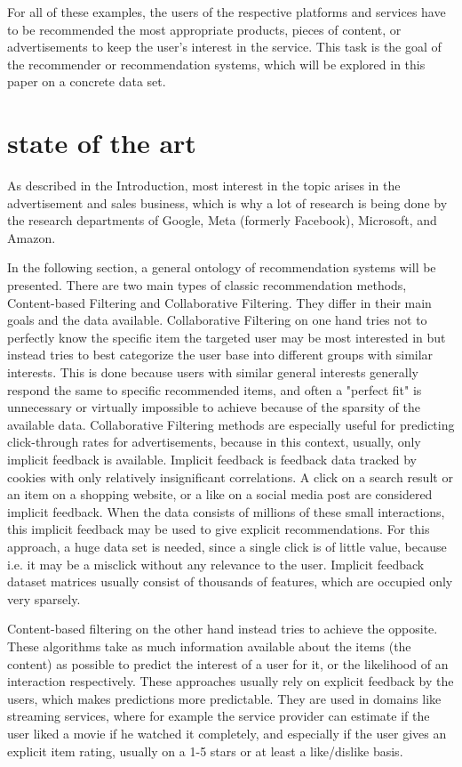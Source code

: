 \documentclass[10pt,final,journal,a4paper,oneside,twocolumn]{IEEEtran}
\begin{document}
For all of these examples, the users of the respective platforms and services have to be recommended the most appropriate products, pieces of content, or advertisements to keep the user's interest in the service. This task is the goal of the recommender or recommendation systems, which will be explored in this paper on a concrete data set.

\section{state of the art}\label{sec:stateoftheart}
As described in the Introduction, most interest in the topic arises in the advertisement and sales business, which is why a lot of research is being done by the research departments of Google, Meta (formerly Facebook), Microsoft, and Amazon.

In the following section, a general ontology of recommendation systems will be presented.
There are two main types of classic recommendation methods, Content-based Filtering and Collaborative Filtering. They differ in their main goals and the data available. 
Collaborative Filtering on one hand tries not to perfectly know the specific item the targeted user may be most interested in but instead tries to best categorize the user base into different groups with similar interests. This is done because users with similar general interests generally respond the same to specific recommended items, and often a "perfect fit" is unnecessary or virtually impossible to achieve because of the sparsity of the available data.
Collaborative Filtering methods are especially useful for predicting click-through rates for advertisements, because in this context, usually, only implicit feedback is available. Implicit feedback is feedback data tracked by cookies with only relatively insignificant correlations. A click on a search result or an item on a shopping website, or a like on a social media post are considered implicit feedback.  When the data consists of millions of these small interactions, this implicit feedback may be used to give explicit recommendations. For this approach, a huge data set is needed, since a single click is of little value, because i.e. it may be a misclick without any relevance to the user. Implicit feedback dataset matrices usually consist of thousands of features, which are occupied only very sparsely.


Content-based filtering on the other hand instead tries to achieve the opposite. These algorithms take as much information available about the items (the content) as possible to predict the interest of a user for it, or the likelihood of an interaction respectively. These approaches usually rely on explicit feedback by the users, which makes predictions more predictable. They are used in domains like streaming services, where for example the service provider can estimate if the user liked a movie if he watched it completely, and especially if the user gives an explicit item rating, usually on a 1-5 stars or at least a like/dislike basis.
\end{document}
